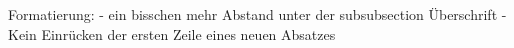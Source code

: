 Formatierung: 
- ein bisschen mehr Abstand unter der subsubsection Überschrift
- Kein Einrücken der ersten Zeile eines neuen Absatzes